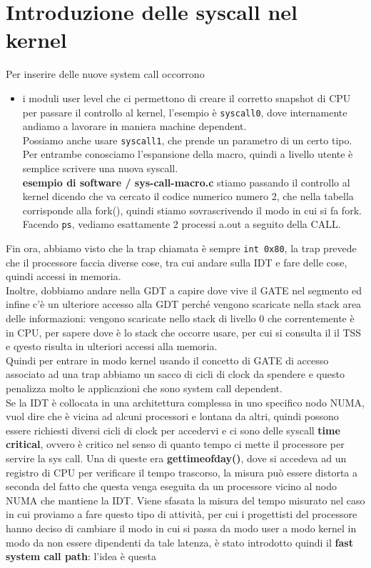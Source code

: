 \documentclass[12pt, oneside]{extbook}
\begin{document}
\section{Introduzione delle syscall nel kernel}
Per inserire delle nuove system call occorrono
\begin{itemize}
\item i moduli user level che ci permettono di creare il corretto snapshot di CPU per passare il controllo al kernel, l'esempio è \texttt{syscall0}, dove internamente andiamo a lavorare in maniera machine dependent.\\Possiamo anche usare \texttt{syscall1}, che prende un parametro di un certo tipo. Per entrambe conosciamo l'espansione della macro, quindi a livello utente è semplice scrivere una nuova syscall.\\
\textbf{esempio di software / sys-call-macro.c}
stiamo passando il controllo al kernel dicendo che va cercato il codice numerico numero 2, che nella tabella corrisponde alla fork(), quindi stiamo sovrascrivendo il modo in cui si fa fork. Facendo \texttt{ps}, vediamo esattamente 2 processi a.out a seguito della CALL.
\end{itemize}
Fin ora, abbiamo visto che la trap chiamata è sempre \texttt{int 0x80}, la trap prevede che il processore faccia diverse cose, tra cui andare sulla IDT e fare delle cose, quindi accessi in memoria.\\ Inoltre, dobbiamo andare nella GDT a capire dove vive il GATE nel segmento ed infine c'è un ulteriore accesso alla GDT perché vengono scaricate nella stack area delle informazioni: vengono scaricate nello stack di livello 0 che correntemente è in CPU, per sapere dove è lo stack che occorre usare, per cui si consulta il il TSS e qyesto risulta in ulteriori accessi alla memoria.\\ Quindi per entrare in modo kernel usando il concetto di GATE di accesso associato ad una trap abbiamo un sacco di cicli di clock da spendere e questo penalizza molto le applicazioni che sono system call dependent.\\ Se la IDT è collocata in una architettura complessa in uno specifico nodo NUMA, vuol dire che è vicina ad alcuni processori e lontana da altri, quindi possono essere richiesti diversi cicli di clock per accedervi e ci sono delle syscall \textbf{time critical}, ovvero è critico nel senso di quanto tempo ci mette il processore per servire la sys call. Una di queste era \textbf{gettimeofday()}, dove si accedeva ad un registro di CPU per verificare il tempo trascorso, la misura può essere distorta a seconda del fatto che questa venga eseguita da un processore vicino al nodo NUMA che mantiene la IDT. Viene sfasata la misura del tempo misurato nel caso in cui proviamo a fare questo tipo di attività, per cui i progettisti del processore hanno deciso di cambiare il modo in cui si passa da modo user a modo kernel in modo da non essere dipendenti da tale latenza, è stato introdotto quindi il \textbf{fast system call path}: l'idea è questa
\end{document}
